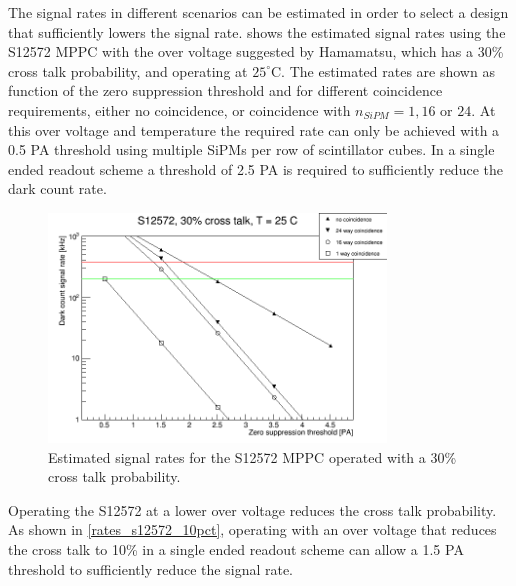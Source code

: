 \documentclass[a4paper]{article}
\begin{document}
The signal rates in different scenarios can be estimated in order to select a design that sufficiently lowers the signal rate.
 shows the estimated signal rates using the S12572 MPPC with the over voltage suggested by Hamamatsu, which has a 30\% cross talk probability, and operating at $25^{\circ}$C.
The estimated rates are shown as function of the zero suppression threshold and for different coincidence requirements, either no coincidence, or coincidence with $n_{SiPM} = 1, 16\mbox{ or }24.$
At this over voltage and temperature the required rate can only be achieved with a 0.5 PA threshold using multiple SiPMs per row of scintillator cubes.
In a single ended readout scheme a threshold of 2.5 PA is required to sufficiently reduce the dark count rate.

\begin{figure}[htp]
    \begin{center}
        \includegraphics[width=0.8\textwidth]{imgs/g_s12572_30pct}
        \caption{Estimated signal rates for the S12572 MPPC operated with a 30\% cross talk probability.}
        \label{rates_s12572_30pct}
    \end{center}
\end{figure}

Operating the S12572 at a lower over voltage reduces the cross talk probability.
As shown in \cref{rates_s12572_10pct}, operating with an over voltage that reduces the cross talk to 10\% in a single ended readout scheme can allow a 1.5 PA threshold to sufficiently reduce the signal rate.
\end{document}
